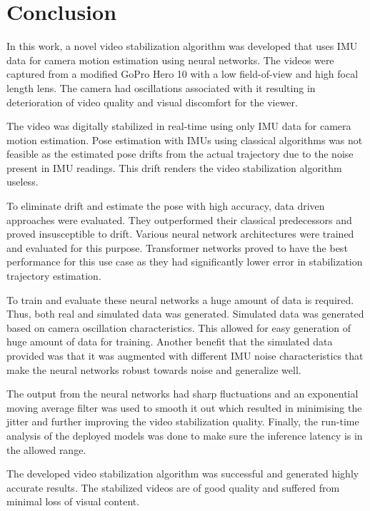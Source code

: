 \chapter{Conclusion} \label{chapter_five}

In this work, a novel video stabilization algorithm was developed that uses IMU data for camera motion estimation using neural networks. The videos were captured from a modified GoPro Hero 10 with a low field-of-view and high focal length lens. The camera had oscillations associated with it resulting in deterioration of video quality and visual discomfort for the viewer.

The video was digitally stabilized in real-time using only IMU data for camera motion estimation. Pose estimation with IMUs using classical algorithms was not feasible as the estimated pose drifts from the actual trajectory due to the noise present in IMU readings. This drift renders the video stabilization algorithm useless.

To eliminate drift and estimate the pose with high accuracy, data driven approaches were evaluated. They outperformed their classical predecessors and proved insusceptible to drift. Various neural network architectures were trained and evaluated for this purpose. Transformer networks proved to have the best performance for this use case as they had significantly lower error in stabilization trajectory estimation.

To train and evaluate these neural networks a huge amount of data is required. Thus, both real and simulated data was generated. Simulated data was generated based on camera oscillation characteristics. This allowed for easy generation of huge amount of data for training. Another benefit that the simulated data provided was that it was augmented with different IMU noise characteristics that make the neural networks robust towards noise and generalize well.

The output from the neural networks had sharp fluctuations and an exponential moving average filter was used to smooth it out which resulted in minimising the jitter and further improving the video stabilization quality. Finally, the run-time analysis of the deployed models was done to make sure the inference latency is in the allowed range.

The developed video stabilization algorithm was successful and generated highly accurate results. The stabilized videos are of good quality and suffered from minimal loss of visual content. 

